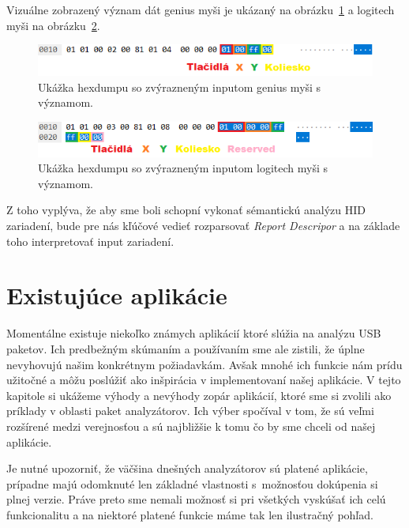 Vizuálne zobrazený význam dát genius myši je ukázaný na obrázku~\ref{obr:uvod:genius:input:vyznam} a logitech myši na obrázku~\ref{obr:uvod:logitech:input:vyznam}.

\begin{figure}[!htb]
	\centering
	\includegraphics[width=12cm]{img/uvod_genius_input_vyznam}
	\caption{Ukážka hexdumpu so zvýrazneným inputom genius myši s významom.}
	\label{obr:uvod:genius:input:vyznam}
\end{figure}

\begin{figure}[!htb]
	\centering
	\includegraphics[width=12cm]{img/uvod_logitech_input_vyznam}
	\caption{Ukážka hexdumpu so zvýrazneným inputom logitech myši s významom.}
	\label{obr:uvod:logitech:input:vyznam}
\end{figure}

Z toho vyplýva, že aby sme boli schopní vykonať sémantickú analýzu HID zariadení, bude pre nás kľúčové vedieť rozparsovať \textit{Report Descripor} a na základe toho interpretovať input zariadení.

\section{Existujúce aplikácie}

Momentálne existuje niekoľko známych aplikácií ktoré slúžia na analýzu USB paketov. Ich predbežným skúmaním a používaním sme ale zistili, že úplne nevyhovujú našim konkrétnym požiadavkám. Avšak mnohé ich funkcie nám prídu užitočné a môžu poslúžiť ako inšpirácia v implementovaní našej aplikácie. V tejto kapitole si ukážeme výhody a nevýhody zopár aplikácií, ktoré sme si zvolili ako príklady v oblasti paket analyzátorov. Ich výber spočíval v tom, že sú veľmi rozšírené medzi verejnosťou a sú najbližšie k tomu čo by sme chceli od našej aplikácie.

Je nutné upozorniť, že väčšina dnešných analyzátorov sú platené aplikácie, prípadne majú odomknuté len základné vlastnosti s~možnosťou dokúpenia si plnej verzie. Práve preto sme nemali možnosť si pri všetkých vyskúšať ich celú funkcionalitu a na niektoré platené funkcie máme tak len ilustračný pohľad.



